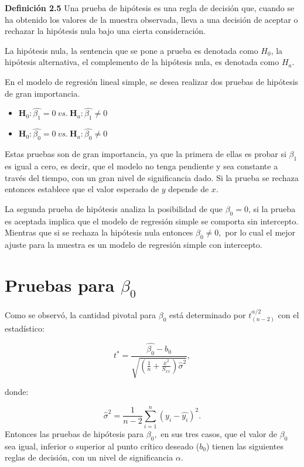 \documentclass[
  a4paper,
  oneside,
  openany]{book}
\begin{document}
\textbf{Definición 2.5} Una prueba de hipótesis es una regla de decisión que, cuando se ha obtenido los valores de la muestra observada, lleva a una decisión de aceptar o rechazar la hipótesis nula bajo una cierta consideración.

La hipótesis nula, la sentencia que se pone a prueba es denotada como \(H_0\), la hipótesis alternativa, el complemento de la hipótesis nula, es denotada como \(H_a.\)

En el modelo de regresión lineal simple, se desea realizar dos pruebas de hipótesis de gran importancia.

\begin{itemize}
\item
  \(\textbf{H}_0: \hat{\beta_{1}}=0 \ vs. \  \textbf{H}_a:\hat{\beta_{1}} \neq 0\)
\item
  \(\textbf{H}_0: \hat{\beta_{0}}=0 \ vs. \  \textbf{H}_a:\hat{\beta_{0}} \neq 0\)
\end{itemize}

Estas pruebas son de gran importancia, ya que la primera de ellas es probar si \(\beta_{1}\) es igual a cero, es decir, que el modelo no tenga pendiente y sea constante a través del tiempo, con un gran nivel de significancia dado. Si la prueba se rechaza entonces establece que el valor esperado de \(y\) depende de \(x\).

La segunda prueba de hipótesis analiza la posibilidad de que \(\beta_{0}=0\), si la prueba es aceptada implica que el modelo de regresión simple se comporta sin intercepto. Mientras que si se rechaza la hipótesis nula entonces \(\beta_{0}\neq 0,\) por lo cual el mejor ajuste para la muestra es un modelo de regresión simple con intercepto.

\hypertarget{pruebas-para-beta_0}{%
\section{\texorpdfstring{Pruebas para \(\beta_{0}\)}{Pruebas para \textbackslash beta\_\{0\}}}\label{pruebas-para-beta_0}}

Como se observó, la cantidad pivotal para \(\beta_{0}\) está determinado por \(t^{\alpha/2}_{(n-2)}\) con el estadístico:

\[t^*=\frac{\hat{\beta_{0}}-b_{0}}{\sqrt{\left(\frac{1}{n}+\frac{\overline{x}^2}{S_{xx}}\right)\hat{\sigma}^2}},\]

donde:

\[\hat{\sigma}^2=\frac{1}{n-2}\sum_{i=1}^{n}(y_{i}-\hat{y_{i}})^2.\]
Entonces las pruebas de hipótesis para \(\beta_{0},\) en sus tres casos, que el valor de \(\beta_{0}\) sea igual, inferior o superior al punto crítico deseado (\(b_{0}\)) tienen las siguientes reglas de decisión, con un nivel de significancia \(\alpha\).
\end{document}
